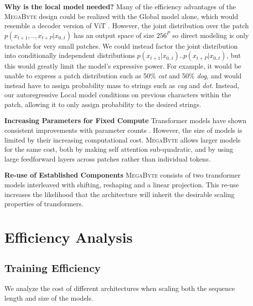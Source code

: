 \documentclass{article}
\newcommand{\fastslow}[0]{\textsc{MegaByte}\xspace}
\newcommand{\megabyte}[0]{\fastslow}
\theoremstyle{plain}
\theoremstyle{definition}
\theoremstyle{remark}
\begin{document}
\textbf{Why is the local model needed?} Many of the efficiency advantages of the \megabyte design could be realized with the Global model alone, which would resemble a decoder version of ViT \citep{vit}. However,  the joint distribution over the patch $p(x_{t+1},..,x_{t+P}|x_{0..t})$ has an output space of size $256^{P}$ so direct modeling is only tractable for very small patches. We could instead factor the joint distribution into conditionally independent distributions $p(x_{t+1}|x_{0..t})..p(x_{t+P}|x_{0..t})$, but this would greatly limit the model's expressive power. For example, it would be unable to express a patch distribution such as 50\% \emph{cat} and 50\% \emph{dog}, and would instead have to assign probability mass to strings such as \emph{cag} and \emph{dot}. Instead, our autoregressive Local model conditions on previous characters within the patch, allowing it to only assign probability to the desired strings.

\textbf{Increasing Parameters for Fixed Compute}  Transformer models have shown consistent improvements with parameter counts \citep{kaplan2020scaling}. However, the size of models is limited by their increasing computational cost. \megabyte allows larger models for the same cost, both by making self attention sub-quadratic, and by using large feedforward layers across patches rather than individual tokens.

\textbf{Re-use of Established Components} \megabyte consists of two transformer models interleaved with shifting, reshaping and a linear projection. This re-use increases the likelihood that the architecture will inherit the desirable scaling properties of transformers.

\section{Efficiency Analysis}
\subsection{Training Efficiency}
We analyze the cost of different architectures when scaling both the sequence length and size of the models.
\end{document}
